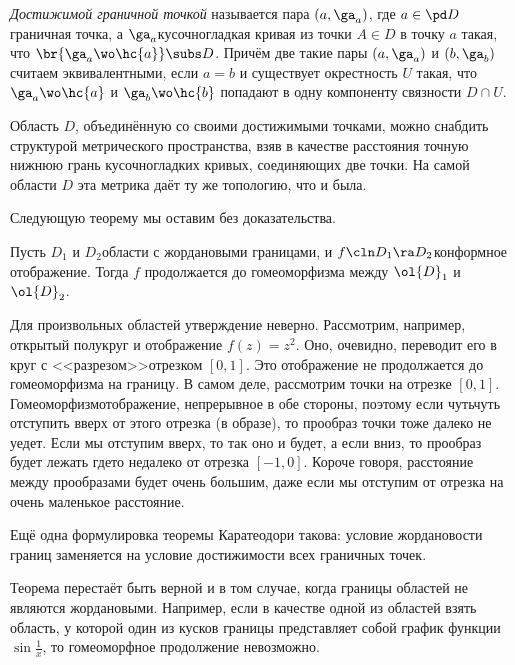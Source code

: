 \documentclass[a4paper]{article}
\begin{document}
\begin{df}
\emph{Достижимой граничной точкой} называется пара $(a,\ga_a)$, где $a\in\pd D$\т граничная точка, а
$\ga_a$\т кусочно\д гладкая кривая из точки $A \in D$ в точку $a$ такая, что $\br{\ga_a \wo \hc{a}}\subs D$.
Причём две такие пары $(a,\ga_a)$ и $(b,\ga_b)$ считаем эквивалентными, если $a=b$
и существует окрестность $U$ такая, что $\ga_a \wo \hc{a}$ и $\ga_b \wo \hc{b}$ попадают в одну компоненту
связности $D\cap U$.
\end{df}

\begin{note}
Область $D$, объединённую со своими достижимыми точками, можно снабдить
структурой метрического пространства, взяв в качестве расстояния точную нижнюю грань
кусочно\д гладких кривых, соединяющих две точки.
На самой области $D$ эта метрика даёт ту же топологию, что и была.
\end{note}

Следующую теорему мы оставим без доказательства.
\begin{theorem}[Каратеодори]
Пусть $D_1$ и $D_2$\т области с жордановыми границами, и
$f\cln D_1\ra D_2$\т конформное отображение. Тогда $f$ продолжается до гомеоморфизма между $\ol{D}_1$ и $\ol{D}_2$.
\end{theorem}

\begin{note}
Для произвольных областей утверждение неверно. Рассмотрим, например, открытый полукруг и отображение $f(z)=z^2$.
Оно, очевидно, переводит его в круг с <<разрезом>>\т отрезком $[0,1]$. Это отображение не продолжается
до гомеоморфизма на границу.
В самом деле, рассмотрим точки на отрезке $[0,1]$. Гомеоморфизм\т отображение, непрерывное
в обе стороны, поэтому если чуть\д чуть отступить вверх от этого отрезка (в образе), то прообраз точки тоже далеко не уедет.
Если мы отступим вверх, то так оно и будет, а если вниз, то прообраз будет лежать где\д то недалеко от отрезка $[-1,0]$.
Короче говоря, расстояние между прообразами будет очень большим, даже если мы отступим от отрезка на очень маленькое
расстояние.
\end{note}

Ещё одна формулировка теоремы Каратеодори такова: условие жордановости
границ заменяется на условие достижимости всех граничных точек.

\begin{note}
Теорема  перестаёт быть верной и в том случае, когда границы областей не являются жордановыми. Например, если в качестве
одной из областей взять область, у которой один из кусков границы представляет собой график функции
$\sin \frac{1}{x}$, то гомеоморфное продолжение невозможно.
\end{note}
\end{document}
